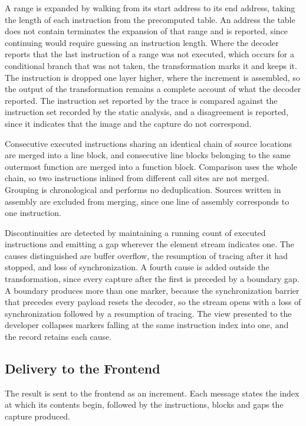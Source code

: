 A range is expanded by walking from its start address to its end address, taking the length of each instruction from the precomputed table. An address the table does not contain terminates the expansion of that range and is reported, since continuing would require guessing an instruction length. Where the decoder reports that the last instruction of a range was not executed, which occurs for a conditional branch that was not taken, the transformation marks it and keeps it. The instruction is dropped one layer higher, where the increment is assembled, so the output of the transformation remains a complete account of what the decoder reported. The instruction set reported by the trace is compared against the instruction set recorded by the static analysis, and a disagreement is reported, since it indicates that the image and the capture do not correspond.

Consecutive executed instructions sharing an identical chain of source locations are merged into a line block, and consecutive line blocks belonging to the same outermost function are merged into a function block. Comparison uses the whole chain, so two instructions inlined from different call sites are not merged. Grouping is chronological and performs no deduplication. Sources written in assembly are excluded from merging, since one line of assembly corresponds to one instruction.

Discontinuities are detected by maintaining a running count of executed instructions and emitting a gap wherever the element stream indicates one. The causes distinguished are buffer overflow, the resumption of tracing after it had stopped, and loss of synchronization. A fourth cause is added outside the transformation, since every capture after the first is preceded by a boundary gap. A boundary produces more than one marker, because the synchronization barrier that precedes every payload resets the decoder, so the stream opens with a loss of synchronization followed by a resumption of tracing. The view presented to the developer collapses markers falling at the same instruction index into one, and the record retains each cause.

\subsection{Delivery to the Frontend}
The result is sent to the frontend as an increment. Each message states the index at which its contents begin, followed by the instructions, blocks and gaps the capture produced.

